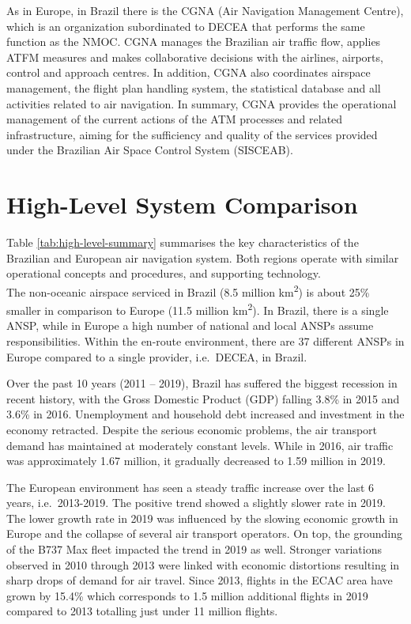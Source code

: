 \documentclass[
]{book}
\begin{document}
As in Europe, in Brazil there is the CGNA (Air Navigation Management Centre), which is an organization subordinated to DECEA that performs the same function as the NMOC.
CGNA manages the Brazilian air traffic flow, applies ATFM measures and makes collaborative decisions with the airlines, airports, control and approach centres.
In addition, CGNA also coordinates airspace management, the flight plan handling system, the statistical database and all activities related to air navigation.
In summary, CGNA provides the operational management of the current actions of the ATM processes and related infrastructure, aiming for the sufficiency and quality of the services provided under the Brazilian Air Space Control System (SISCEAB).

\hypertarget{highlevelsystemcomp}{%
\section{High-Level System Comparison}\label{highlevelsystemcomp}}

Table \ref{tab:high-level-summary} summarises the key characteristics of the Brazilian and European air navigation system.
Both regions operate with similar operational concepts and procedures, and supporting technology.\\
The non-oceanic airspace serviced in Brazil (8.5 million km\textsuperscript{2}) is about 25\% smaller in comparison to Europe (11.5 million km\textsuperscript{2}).
In Brazil, there is a single ANSP, while in Europe a high number of national and local ANSPs assume responsibilities. Within the en-route environment, there are 37 different ANSPs in Europe compared to a single provider, i.e.~DECEA, in Brazil.

Over the past 10 years (2011 -- 2019), Brazil has suffered the biggest recession in recent history, with the Gross Domestic Product (GDP) falling 3.8\% in 2015 and 3.6\% in 2016. Unemployment and household debt increased and investment in the economy retracted. Despite the serious economic problems, the air transport demand has maintained at moderately constant levels. While in 2016, air traffic was approximately 1.67 million, it gradually decreased to 1.59 million in 2019.

The European environment has seen a steady traffic increase over the last 6 years, i.e.~2013-2019.
The positive trend showed a slightly slower rate in 2019.
The lower growth rate in 2019 was influenced by the slowing economic growth in Europe and the collapse of several air transport operators. On top, the grounding of the B737 Max fleet impacted the trend in 2019 as well.
Stronger variations observed in 2010 through 2013 were linked with economic distortions resulting in sharp drops of demand for air travel.
Since 2013, flights in the ECAC area have grown by 15.4\% which corresponds to 1.5 million additional flights in 2019 compared to 2013 totalling just under 11 million flights.
\end{document}
